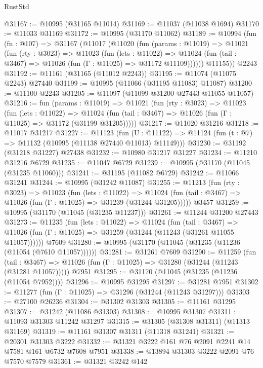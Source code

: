 \begin{lexlean}{RustStd}
\begin{coremodule}
@31167 := @10995 (@31165 @11014)
@31169 := @11037 (@11038 @1694)
@31170 := @11033 @31169
@31172 := @10995 (@31170 @11062)
@31189 := @10994
    (fun (fn : @107) =>
    @31167
      (@11017
        (@11020
          (fun (params : @11019) =>
          @11021
            (fun (rty : @3023) =>
            @11023
              (fun (lets : @11022) =>
              @11024 (fun (tail : @3467) => @11026 (fun (Γ : @11025) => @31172 @11109))))))
        @11155))
    @2243
@31192 := @11161 (@31165 (@11012 @2243))
@31195 := @11074 (@11075 @2243) @27440
@31199 := @10995 (@11066 (@31195 @11083) @11087)
@31200 := @11100 @2243
@31205 := @11097 (@11099 @31200 @27443 @11055 @11057)
@31216 := fun (params : @11019) =>
  @11021
    (fun (rty : @3023) =>
    @11023
      (fun (lets : @11022) =>
      @11024 (fun (tail : @3467) => @11026 (fun (Γ : @11025) => @31172 (@31199 @31205)))))
@31217 := @11020 @31216
@31218 := @11017 @31217
@31227 := @11123
    (fun (U : @11122) => @11124 (fun (t : @7) => @11132 (@10995 (@11138 @27440 @11013) @11149)))
@31230 := @31192 (@31218 @31227) @27438
@31232 := @10980 @31217 @31227
@31234 := @11210 @31216 @6729
@31235 := @11047 @6729
@31239 := @10995 (@31170 (@11045 (@31235 @11060)))
@31241 := @31195 (@11082 @6729)
@31242 := @11066 @31241
@31244 := @10995 (@31242 @11087)
@31255 := @11213
    (fun (rty : @3023) =>
    @11023
      (fun (lets : @11022) =>
      @11024 (fun (tail : @3467) => @11026 (fun (Γ : @11025) => @31239 (@31244 @31205)))))
    @3457
@31259 := @10995 (@31170 (@11045 (@31235 @11237)))
@31261 := @11244 @31200 @27443
@31273 := @11235
    (fun (lets : @11022) =>
    @11024
      (fun (tail : @3467) =>
      @11026 (fun (Γ : @11025) => @31259 (@31244 (@11243 (@31261 @11055 @11057))))))
    @7609
@31280 := @10995 (@31170 (@11045 (@31235 (@11236 (@11054 (@7610 @11057))))))
@31281 := @31261 @7609
@31290 := @11259
    (fun (tail : @3467) => @11026 (fun (Γ : @11025) => @31280 (@31244 (@11243 (@31281 @11057)))))
    @7951
@31295 := @31170 (@11045 (@31235 (@11236 (@11054 @7952))))
@31296 := @10995 @31295
@31297 := @31281 @7951
@31302 := @11277 (fun (Γ : @11025) => @31296 (@31244 (@11243 @31297)))
@31303 := @27100 @26236
@31304 := @31302 @31303
@31305 := @11161 @31295
@31307 := @31242 (@11086 @31303)
@31308 := @10995 @31307
@31311 := @11093 @31303 @11242 @31297
@31315 := @31305 (@31308 @31311) (@11313 @31169)
@31319 := @11161 @31307 @31311 (@11318 @31241)
@31321 := @20301 @31303 @3222
@31332 := @31321 @3222 @161 @76 @2091 @2241 @14 @7581 @161 @6732 @7608 @7951
@31338 := @13894 @31303 @3222 @2091 @76 @7570 @7579
@31361 := @31321
    @3242
    @142

\end{coremodule}
\end{lexlean}
